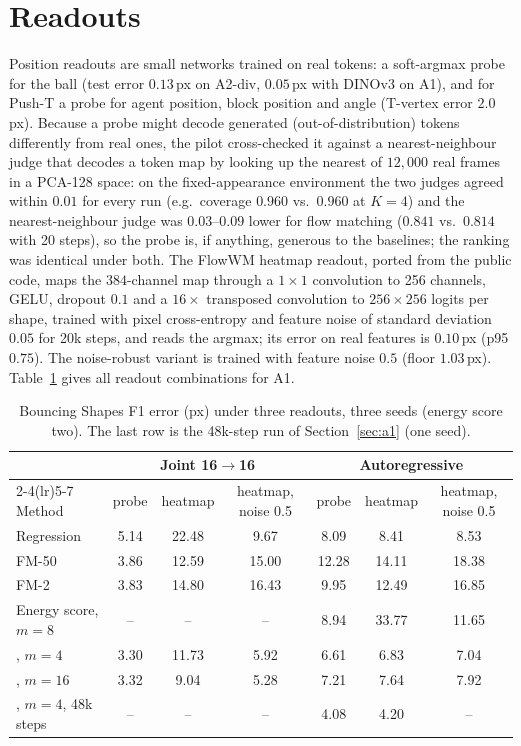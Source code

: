 \section{Readouts}
\label{app:readout}
Position readouts are small networks trained on real tokens: a soft-argmax probe for the ball (test error $0.13$\,px on A2-div, $0.05$\,px with DINOv3 on A1), and for Push-T a probe for agent position, block position and angle (T-vertex error $2.0$\,px). Because a probe might decode generated (out-of-distribution) tokens differently from real ones, the pilot cross-checked it against a nearest-neighbour judge that decodes a token map by looking up the nearest of $12{,}000$ real frames in a PCA-128 space: on the fixed-appearance environment the two judges agreed within $0.01$ for every \imlewm{} run (e.g.\ coverage $0.960$ vs.\ $0.960$ at $K{=}4$) and the nearest-neighbour judge was $0.03$--$0.09$ lower for flow matching ($0.841$ vs.\ $0.814$ with 20 steps), so the probe is, if anything, generous to the baselines; the ranking was identical under both. The FlowWM heatmap readout, ported from the public code, maps the $384$-channel map through a $1\times1$ convolution to 256 channels, GELU, dropout $0.1$ and a $16\times$ transposed convolution to $256\times256$ logits per shape, trained with pixel cross-entropy and feature noise of standard deviation $0.05$ for 20k steps, and reads the argmax; its error on real features is $0.10$\,px (p95 $0.75$). The noise-robust variant is trained with feature noise $0.5$ (floor $1.03$\,px). Table~\ref{tab:readout} gives all readout combinations for A1.

\begin{table}[h]
\caption{Bouncing Shapes F1 error (px) under three readouts, three seeds (energy score two). The last row is the 48k-step run of Section~\ref{sec:a1} (one seed).}
\label{tab:readout}
\begin{center}
\small
\begin{tabular}{lcccccc}
\toprule
 & \multicolumn{3}{c}{Joint 16$\to$16} & \multicolumn{3}{c}{Autoregressive} \\
\cmidrule(lr){2-4}\cmidrule(lr){5-7}
Method & probe & heatmap & heatmap, noise 0.5 & probe & heatmap & heatmap, noise 0.5 \\
\midrule
Regression & 5.14 & 22.48 & 9.67 & 8.09 & 8.41 & 8.53 \\
FM-50 & 3.86 & 12.59 & 15.00 & 12.28 & 14.11 & 18.38 \\
FM-2 & 3.83 & 14.80 & 16.43 & 9.95 & 12.49 & 16.85 \\
Energy score, $m{=}8$ & -- & -- & -- & 8.94 & 33.77 & 11.65 \\
\imlewm{}, $m{=}4$ & 3.30 & 11.73 & 5.92 & 6.61 & 6.83 & 7.04 \\
\imlewm{}, $m{=}16$ & 3.32 & 9.04 & 5.28 & 7.21 & 7.64 & 7.92 \\
\imlewm{}, $m{=}4$, 48k steps & -- & -- & -- & 4.08 & 4.20 & -- \\
\bottomrule
\end{tabular}
\end{center}
\end{table}

